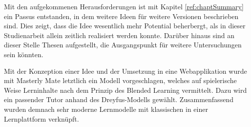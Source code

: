 Mit den aufgekommenen Herausforderungen ist mit Kapitel \ref{ref:chaptSummary}
ein Passus entstanden, in dem weitere Ideen für weitere Versionen beschrieben
sind. Dies zeigt, dass die Idee wesentlich mehr Potential beherbergt, als in
dieser Studienarbeit allein zeitlich realisiert werden konnte. Darüber hinaus
sind an dieser Stelle Thesen aufgestellt, die Ausgangspunkt für weitere
Untersuchungen sein könnten.

Mit der Konzeption einer Idee und der Umsetzung in eine Webapplikation wurde mit
Masterly Mate letztlich ein Modell vorgeschlagen, welches auf spielerische Weise
Lerninhalte nach dem Prinzip des Blended Learning vermittelt. Dazu wird ein
passender Tutor anhand des Dreyfus-Modells gewählt. Zusammenfassend wurden
demnach sehr moderne Lernmodelle mit klassischen in einer Lernplattform
verknüpft.